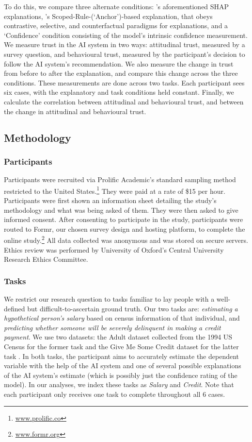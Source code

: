 To do this, we compare three alternate conditions: \textcite{lundberg_unified_2017}'s aforementioned SHAP explanations, \textcite{ribeiro_anchors_2018}'s Scoped-Rule-(`Anchor')-based explanation, that obeys contrastive, selective, and counterfactual paradigms for explanations, and a `Confidence' condition consisting of the model's intrinsic confidence measurement. We measure trust in the AI system in two ways: attitudinal trust, measured by a survey question, and behavioural trust, measured by the participant's decision to follow the AI system's recommendation. We also measure the change in trust from before to after the explanation, and compare this change across the three conditions. These measurements are done across two tasks. Each participant sees six cases, with the explanatory and task conditions held constant. Finally, we calculate the correlation between attitudinal and behavioural trust, and between the change in attitudinal and behavioural trust.

\subsection{Methodology}
\subsubsection{Participants}
Participants were recruited via Prolific Academic's standard sampling method restricted to the United States.\footnote{\url{www.prolific.co}} They were paid at a rate of \$15 per hour. Participants were first shown an information sheet detailing the study's methodology and what was being asked of them. They were then asked to give informed consent. After consenting to participate in the study, participants were routed to Formr, our chosen survey design and hosting platform, to complete the online study.\footnote{\url{www.formr.org}} All data collected was anonymous and was stored on secure servers. Ethics review was performed by University of Oxford's Central University Research Ethics Committee.

\subsubsection{Tasks}
We restrict our research question to tasks familiar to lay people with a well-defined but difficult-to-ascertain ground truth. Our two tasks are: \emph{estimating a hypothetical person's salary} based on census information of that individual, and \emph{predicting whether someone will be severely delinquent in making a credit payment}. We use two datasets: the Adult dataset collected from the 1994 US Census for the former task and the Give Me Some Credit dataset for the latter task \cite{kohavi_scaling_1996, GiveMeSomeCredit}. In both tasks, the participant aims to accurately estimate the dependent variable with the help of the AI system and one of several possible explanations of the AI system's estimate (which is possibly just the confidence rating of the model). In our analyses, we index these tasks as \emph{Salary} and \emph{Credit}. Note that each participant only receives one task to complete throughout all 6 cases. 

